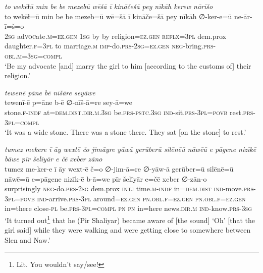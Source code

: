 \ea \label{ŽP.165}
\textit{to wekēɫū min be be mezebū wēšā ī kināčešā pey nīkāh kerew nārīšo} \\ 
\gll to wekēɫ=ū min be be mezeb=ū wē=šā ī kināče=šā pey nīkāh ∅-ker-e=ū ne-ār-ī=š=o \\ 
 \textsc{2sg} ad\textsc{voc}ate\textsc{.m}\textsc{\textsc{=ez.gen}} \textsc{1sg} by by religion\textsc{\textsc{=ez.gen}} \textsc{reflx}\textsc{=3pl} dem.prox daughter\textsc{.f}\textsc{=3pl} to marriage\textsc{.m} \textsc{imp-}do\textsc{.prs}-\textsc{2sg}\textsc{\textsc{=ez.gen}} \textsc{neg-}bring\textsc{.prs}\textsc{-obl}\textsc{.m}\textsc{=3sg}\textsc{=compl} \\ 
\glt `Be my advocate [and] marry the girl to him [according to the customs of] their religion.'
\z 
 
\ea \label{ŽP.171}
\textit{tewenē pāne bē nīšāre seyāwe} \\ 
\gll tewenī-ē p=āne b-ē ∅-nīš-ā=re sey-ā=we \\ 
 stone\textsc{.f}\textsc{-indf} at=\textsc{dem.dist}\textsc{.dir}\textsc{.m}\textsc{.3sg} be\textsc{.prs}\textsc{-pstc}\textsc{.3sg} \textsc{ind-}sit\textsc{.prs}\textsc{-3pl}\textsc{=\textsc{povb}} rest\textsc{.prs}\textsc{-3pl}\textsc{=compl} \\ 
\glt `It was a wide stone. There was a stone there. They sat [on the stone] to rest.'
\z 
 
\ea \label{ŽP.175}
\textit{tumez mekere ī āy wextē čo jimāyre yāwā gerūberū silēnēū nāwēū e pāgene nizīkē bāwe pīr šelīyār e čē xeber zāno} \\ 
\gll tumez me-ker-e ī āy wext-ē č=o ∅-jim-ā=re ∅-yāw-ā gerūber=ū silēnē=ū nāwē=ū e=pāgene nizīk-ē b-ā=we pīr šelīyār e=čē xeber ∅-zān-o \\ 
 surprisingly \textsc{neg-}do\textsc{.prs}-\textsc{2sg} dem.prox \textsc{intj} time\textsc{.m}\textsc{-indf} in=\textsc{dem.dist} \textsc{ind-}move\textsc{.prs}\textsc{-3pl}\textsc{=\textsc{povb}} \textsc{ind-}arrive\textsc{.prs}\textsc{-3pl} around\textsc{\textsc{=ez.gen}} \textsc{pn}\textsc{.obl}\textsc{.f}\textsc{\textsc{=ez.gen}} \textsc{pn}\textsc{.obl}\textsc{.f}\textsc{\textsc{=ez.gen}} in=there close\textsc{\textsc{-pl}} be\textsc{.prs}\textsc{-3pl}\textsc{=compl} \textsc{pn} \textsc{pn} in=here news\textsc{.dir}\textsc{.m} \textsc{ind-}know\textsc{.prs}\textsc{-3sg} \\ 
\glt `It turned out\footnote{Lit. You wouldn’t say/see!} that he (Pir Shaliyar) became aware of [the sound] ‘Oh’ [that the girl said] while they were walking and were getting close to somewhere between Slen and Naw.'
\z 
 
